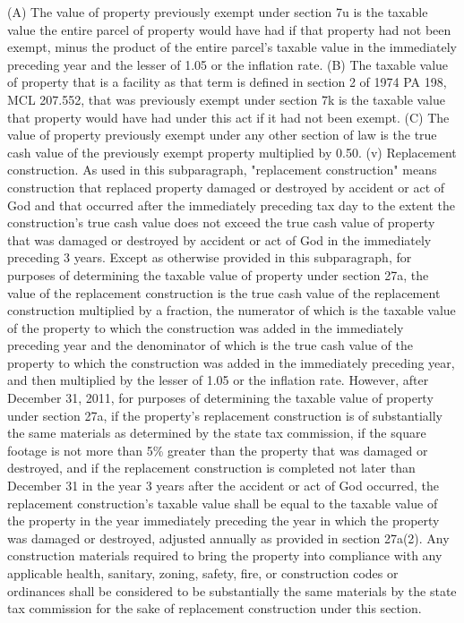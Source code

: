 \documentclass[12pt,\documentclassflag]{michiganCourtOfAppealsBrief}
\begin{document}
  (A) The value of property previously exempt under section 7u is the taxable value the entire parcel of property would have had if that property had not been exempt, minus the product of the entire parcel's taxable value in the immediately preceding year and the lesser of 1.05 or the inflation rate.
  (B) The taxable value of property that is a facility as that term is defined in section 2 of 1974 PA 198, MCL 207.552, that was previously exempt under section 7k is the taxable value that property would have had under this act if it had not been exempt.
  (C) The value of property previously exempt under any other section of law is the true cash value of the previously exempt property multiplied by 0.50.
  (v) Replacement construction. As used in this subparagraph, "replacement construction" means construction that replaced property damaged or destroyed by accident or act of God and that occurred after the immediately preceding tax day to the extent the construction's true cash value does not exceed the true cash value of property that was damaged or destroyed by accident or act of God in the immediately preceding 3 years. Except as otherwise provided in this subparagraph, for purposes of determining the taxable value of property under section 27a, the value of the replacement construction is the true cash value of the replacement construction multiplied by a fraction, the numerator of which is the taxable value of the property to which the construction was added in the immediately preceding year and the denominator of which is the true cash value of the property to which the construction was added in the immediately preceding year, and then multiplied by the lesser of 1.05 or the inflation rate. However, after December 31, 2011, for purposes of determining the taxable value of property under section 27a, if the property's replacement construction is of substantially the same materials as determined by the state tax commission, if the square footage is not more than 5\% greater than the property that was damaged or destroyed, and if the replacement construction is completed not later than December 31 in the year 3 years after the accident or act of God occurred, the replacement construction's taxable value shall be equal to the taxable value of the property in the year immediately preceding the year in which the property was damaged or destroyed, adjusted annually as provided in section 27a(2). Any construction materials required to bring the property into compliance with any applicable health, sanitary, zoning, safety, fire, or construction codes or ordinances shall be considered to be substantially the same materials by the state tax commission for the sake of replacement construction under this section.
\end{document}
